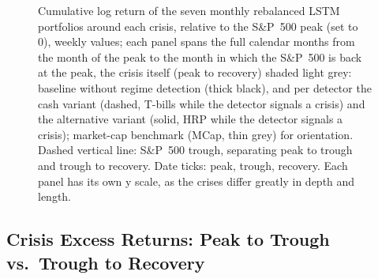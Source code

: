 \documentclass[12pt]{article}
\begin{document}
\begin{figure}[p]
    \caption{Cumulative log return of the seven monthly rebalanced LSTM portfolios around each crisis, relative to the S\&P~500 peak (set to 0), weekly values; each panel spans the full calendar months from the month of the peak to the month in which the S\&P~500 is back at the peak, the crisis itself (peak to recovery) shaded light grey: baseline without regime detection (thick black), and per detector the cash variant (dashed, T-bills while the detector signals a crisis) and the alternative variant (solid, HRP while the detector signals a crisis); market-cap benchmark (MCap, thin grey) for orientation. Dashed vertical line: S\&P~500 trough, separating peak to trough and trough to recovery. Date ticks: peak, trough, recovery. Each panel has its own y scale, as the crises differ greatly in depth and length.}
    \label{fig:crises_lstm}
\end{figure}

\FloatBarrier

\subsection{Crisis Excess Returns: Peak to Trough vs.\ Trough to Recovery}
\end{document}
